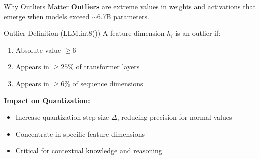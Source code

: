\documentclass[aspectratio=169,10pt]{beamer}
\begin{document}
\begin{frame}{Why Outliers Matter}
    \textbf{Outliers} are extreme values in weights and activations that emerge when models exceed $\sim$6.7B parameters.

    \vspace{0.3cm}
    \begin{block}{Outlier Definition (LLM.int8())}
        A feature dimension $h_i$ is an outlier if:
        \begin{enumerate}
            \item Absolute value $\ge 6$
            \item Appears in $\ge 25\%$ of transformer layers
            \item Appears in $\ge 6\%$ of sequence dimensions
        \end{enumerate}
    \end{block}

    \vspace{0.3cm}
    \textbf{Impact on Quantization:}
    \begin{itemize}
        \item Increase quantization step size $\Delta$, reducing precision for normal values
        \item Concentrate in specific feature dimensions
        \item Critical for contextual knowledge and reasoning
    \end{itemize}

    \vspace{0.3cm}

\end{frame}
\end{document}
